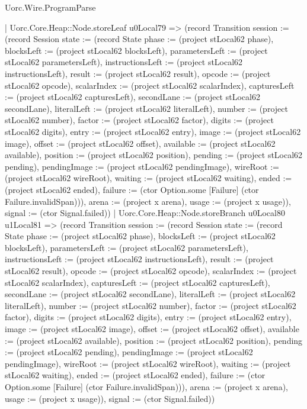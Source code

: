 \begin{lexlean}{Uorc.Wire.ProgramParse}
\begin{semanticmodule}
{        | Uorc.Core.Heap::Node.storeLeaf u0Local79 => (record Transition {session := (record Session {state := (record State {phase := (project stLocal62 phase), blocksLeft := (project stLocal62 blocksLeft), parametersLeft := (project stLocal62 parametersLeft), instructionsLeft := (project stLocal62 instructionsLeft), result := (project stLocal62 result), opcode := (project stLocal62 opcode), scalarIndex := (project stLocal62 scalarIndex), capturesLeft := (project stLocal62 capturesLeft), secondLane := (project stLocal62 secondLane), literalLeft := (project stLocal62 literalLeft), number := (project stLocal62 number), factor := (project stLocal62 factor), digits := (project stLocal62 digits), entry := (project stLocal62 entry), image := (project stLocal62 image), offset := (project stLocal62 offset), available := (project stLocal62 available), position := (project stLocal62 position), pending := (project stLocal62 pending), pendingImage := (project stLocal62 pendingImage), wireRoot := (project stLocal62 wireRoot), waiting := (project stLocal62 waiting), ended := (project stLocal62 ended), failure := (ctor Option.some [Failure] (ctor Failure.invalidSpan))}), arena := (project x arena), usage := (project x usage)}), signal := (ctor Signal.failed)})
        | Uorc.Core.Heap::Node.storeBranch u0Local80 u1Local81 => (record Transition {session := (record Session {state := (record State {phase := (project stLocal62 phase), blocksLeft := (project stLocal62 blocksLeft), parametersLeft := (project stLocal62 parametersLeft), instructionsLeft := (project stLocal62 instructionsLeft), result := (project stLocal62 result), opcode := (project stLocal62 opcode), scalarIndex := (project stLocal62 scalarIndex), capturesLeft := (project stLocal62 capturesLeft), secondLane := (project stLocal62 secondLane), literalLeft := (project stLocal62 literalLeft), number := (project stLocal62 number), factor := (project stLocal62 factor), digits := (project stLocal62 digits), entry := (project stLocal62 entry), image := (project stLocal62 image), offset := (project stLocal62 offset), available := (project stLocal62 available), position := (project stLocal62 position), pending := (project stLocal62 pending), pendingImage := (project stLocal62 pendingImage), wireRoot := (project stLocal62 wireRoot), waiting := (project stLocal62 waiting), ended := (project stLocal62 ended), failure := (ctor Option.some [Failure] (ctor Failure.invalidSpan))}), arena := (project x arena), usage := (project x usage)}), signal := (ctor Signal.failed)})
}
\end{semanticmodule}
\end{lexlean}
